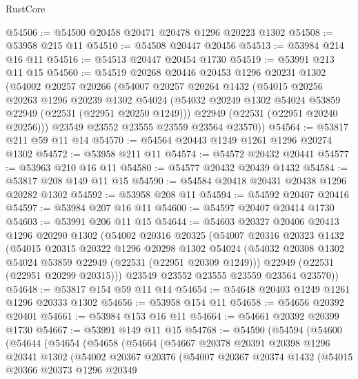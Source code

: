 \begin{lexlean}{RustCore}
\begin{coremodule}
@54506 := @54500 @20458 @20471 @20478 @1296 @20223 @1302
@54508 := @53958 @215 @11
@54510 := @54508 @20447 @20456
@54513 := @53984 @214 @16 @11
@54516 := @54513 @20447 @20454 @1730
@54519 := @53991 @213 @11 @15
@54560 := @54519
    @20268
    @20446
    @20453
    @1296
    @20231
    @1302
    (@54002
      @20257
      @20266
      (@54007
        @20257
        @20264
        @1432
        (@54015
          @20256
          @20263
          @1296
          @20239
          @1302
          @54024
          (@54032 @20249 @1302 @54024 @53859 @22949 (@22531 (@22951 @20250 @1249)))
          @22949
          (@22531 (@22951 @20240 @20256)))
        @23549
        @23552
        @23555
        @23559
        @23564
        @23570))
@54564 := @53817 @211 @59 @11 @14
@54570 := @54564 @20443 @1249 @1261 @1296 @20274 @1302
@54572 := @53958 @211 @11
@54574 := @54572 @20432 @20441
@54577 := @53963 @210 @16 @11
@54580 := @54577 @20432 @20439 @1432
@54584 := @53817 @208 @149 @11 @15
@54590 := @54584 @20418 @20431 @20438 @1296 @20282 @1302
@54592 := @53958 @208 @11
@54594 := @54592 @20407 @20416
@54597 := @53984 @207 @16 @11
@54600 := @54597 @20407 @20414 @1730
@54603 := @53991 @206 @11 @15
@54644 := @54603
    @20327
    @20406
    @20413
    @1296
    @20290
    @1302
    (@54002
      @20316
      @20325
      (@54007
        @20316
        @20323
        @1432
        (@54015
          @20315
          @20322
          @1296
          @20298
          @1302
          @54024
          (@54032 @20308 @1302 @54024 @53859 @22949 (@22531 (@22951 @20309 @1249)))
          @22949
          (@22531 (@22951 @20299 @20315)))
        @23549
        @23552
        @23555
        @23559
        @23564
        @23570))
@54648 := @53817 @154 @59 @11 @14
@54654 := @54648 @20403 @1249 @1261 @1296 @20333 @1302
@54656 := @53958 @154 @11
@54658 := @54656 @20392 @20401
@54661 := @53984 @153 @16 @11
@54664 := @54661 @20392 @20399 @1730
@54667 := @53991 @149 @11 @15
@54768 := @54590
    (@54594
      (@54600
        (@54644
          (@54654
            (@54658
              (@54664
                (@54667
                  @20378
                  @20391
                  @20398
                  @1296
                  @20341
                  @1302
                  (@54002
                    @20367
                    @20376
                    (@54007
                      @20367
                      @20374
                      @1432
                      (@54015
                        @20366
                        @20373
                        @1296
                        @20349

\end{coremodule}
\end{lexlean}
